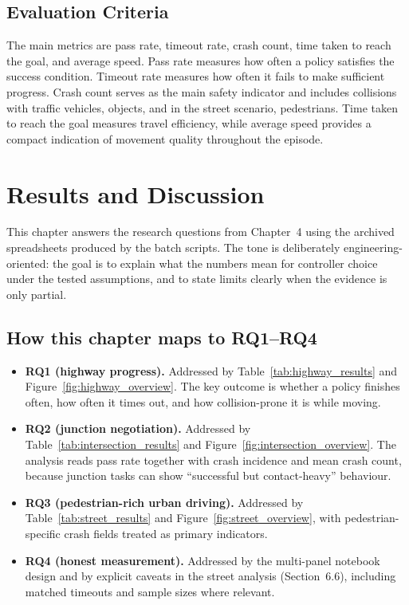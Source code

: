 \documentclass[12pt,a4paper]{report}
\begin{document}
\section{Evaluation Criteria}
The main metrics are pass rate, timeout rate, crash count, time taken to reach the goal, and average speed. Pass rate measures how often a policy satisfies the success condition. Timeout rate measures how often it fails to make sufficient progress. Crash count serves as the main safety indicator and includes collisions with traffic vehicles, objects, and in the street scenario, pedestrians. Time taken to reach the goal measures travel efficiency, while average speed provides a compact indication of movement quality throughout the episode.

\chapter{Results and Discussion}

This chapter answers the research questions from Chapter~4 using the archived spreadsheets produced by the batch scripts. The tone is deliberately engineering-oriented: the goal is to explain what the numbers mean for controller choice under the tested assumptions, and to state limits clearly when the evidence is only partial.

\section{How this chapter maps to RQ1--RQ4}
\begin{itemize}
    \item \textbf{RQ1 (highway progress).} Addressed by Table~\ref{tab:highway_results} and Figure~\ref{fig:highway_overview}. The key outcome is whether a policy finishes often, how often it times out, and how collision-prone it is while moving.
    \item \textbf{RQ2 (junction negotiation).} Addressed by Table~\ref{tab:intersection_results} and Figure~\ref{fig:intersection_overview}. The analysis reads pass rate together with crash incidence and mean crash count, because junction tasks can show ``successful but contact-heavy'' behaviour.
    \item \textbf{RQ3 (pedestrian-rich urban driving).} Addressed by Table~\ref{tab:street_results} and Figure~\ref{fig:street_overview}, with pedestrian-specific crash fields treated as primary indicators.
    \item \textbf{RQ4 (honest measurement).} Addressed by the multi-panel notebook design and by explicit caveats in the street analysis (Section~6.6), including matched timeouts and sample sizes where relevant.
\end{itemize}
\end{document}
